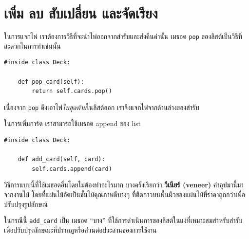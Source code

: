 \section{เพิ่ม ลบ สับเปลี่ยน และจัดเรียง} %

ในการแจกไพ่ เราต้องการวิธีที่จะนำไพ่ออกจากสำรับและส่งคืนค่านั้น เมธอด {\tt pop} ของลิสต์เป็นวิธีที่สะดวกในการทำเช่นนั้น

\begin{verbatim}
#inside class Deck:

    def pop_card(self):
        return self.cards.pop()
\end{verbatim}
%
เนื่องจาก {\tt pop} ดึงเอาไพ่{\em ใบสุดท้าย}ในลิสต์ออก เราจึงแจกไพ่จากด้านล่างของสำรับ

ในการเพิ่มการ์ด เราสามารถใช้เมธอด append ของ list

\begin{verbatim}
#inside class Deck:

    def add_card(self, card):
        self.cards.append(card)
\end{verbatim}
%

วิธีการแบบนี้ที่ใช้เมธอดอื่นโดยไม่ต้องทำอะไรมาก บางครั้งเรียกว่า {\bf วีเนียร์ (veneer)} คำอุปมานี้มาจากงานไม้ 
โดยที่แผ่นไม้อัดเป็นชั้นไม้คุณภาพดีบางๆ ที่ติดกาวบนพื้นผิวของแผ่นไม้ที่ราคาถูกกว่าเพื่อปรับปรุงรูปลักษณ์



ในกรณีนี้ \verb"add_card" เป็น เมธอด ``บาง'' ที่ใช้การดำเนินการของลิสต์ในแง่ที่เหมาะสมสำหรับสำรับ เพื่อปรับปรุงลักษณะที่ปรากฏหรือส่วนต่อประสานของการใช้งาน


